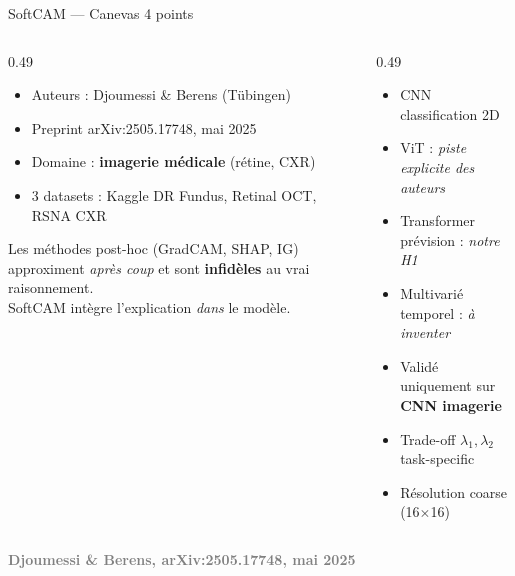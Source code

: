 \documentclass[10pt]{beamer}
\newcommand{\source}[1]{\vspace{4pt}\hfill{\textcolor{gray}{\textbf{\tiny #1}}}}
\begin{document}
\begin{frame}{SoftCAM — Canevas 4 points}
  \begin{columns}
    \begin{column}{0.49\textwidth}
      \begin{ctxbox}
        \begin{itemize}
          \item Auteurs : Djoumessi \& Berens (Tübingen)
          \item Preprint arXiv:2505.17748, mai 2025
          \item Domaine : \textbf{imagerie médicale} (rétine, CXR)
          \item 3 datasets : Kaggle DR Fundus, Retinal OCT, RSNA CXR
        \end{itemize}
      \end{ctxbox}
      \begin{probbox}
        Les méthodes post-hoc (GradCAM, SHAP, IG) approximent \emph{après coup} et sont
        \textbf{infidèles} au vrai raisonnement.\\[2pt]
        SoftCAM intègre l'explication \emph{dans} le modèle.
      \end{probbox}
    \end{column}
    \begin{column}{0.49\textwidth}
      \begin{transposbox}
        \begin{itemize}
          \item CNN classification 2D \checkmark
          \item ViT : \emph{piste explicite des auteurs}
          \item Transformer prévision : \emph{notre H1}
          \item Multivarié temporel : \emph{à inventer}
        \end{itemize}
      \end{transposbox}
      \begin{limitbox}
        \begin{itemize}
          \item Validé uniquement sur \textbf{CNN imagerie}
          \item Trade-off $\lambda_1, \lambda_2$ task-specific
          \item Résolution coarse (16$\times$16)
        \end{itemize}
      \end{limitbox}
    \end{column}
  \end{columns}
  \source{Djoumessi \& Berens, arXiv:2505.17748, mai 2025}
\end{frame}
\end{document}
